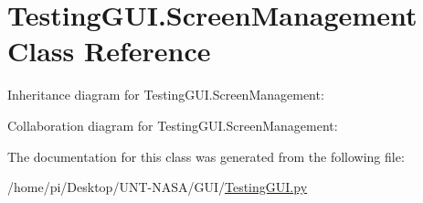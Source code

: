 \hypertarget{classTestingGUI_1_1ScreenManagement}{}\section{Testing\+G\+U\+I.\+Screen\+Management Class Reference}
\label{classTestingGUI_1_1ScreenManagement}


Inheritance diagram for Testing\+G\+U\+I.\+Screen\+Management\+:


Collaboration diagram for Testing\+G\+U\+I.\+Screen\+Management\+:


The documentation for this class was generated from the following file\+:\begin{DoxyCompactItemize}
\item 
/home/pi/\+Desktop/\+U\+N\+T-\/\+N\+A\+S\+A/\+G\+U\+I/\hyperlink{GUI_2TestingGUI_8py}{Testing\+G\+U\+I.\+py}\end{DoxyCompactItemize}
